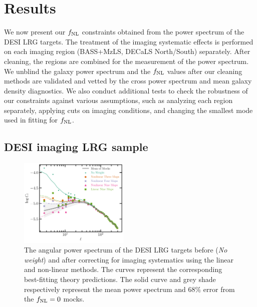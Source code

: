 \section{Results}\label{sec:results}
We now present our $f_{\rm NL}$ constraints obtained from the power spectrum of the DESI LRG targets. The treatment of the imaging systematic effects is performed on each imaging region (BASS+MzLS, DECaLS North/South) separately. After cleaning, the regions are combined for the measurement of the power spectrum. We unblind the galaxy power spectrum and the $f_{\rm NL}$ values after our cleaning methods are validated and vetted by the cross power spectrum and mean galaxy density diagnostics.  We also conduct additional tests to check the robustness of our constraints against various assumptions, such as analyzing each region separately, applying cuts on imaging conditions, and changing the smallest mode used in fitting for $f_{\rm NL}$.

\subsection{DESI imaging LRG sample}
\begin{figure}
    \centering
    \includegraphics[width=0.47\textwidth]{figures/model_dr9.pdf} 
    \caption{The angular power spectrum of the DESI LRG targets before (\textit{No weight}) and after correcting for imaging systematics using the linear and non-linear methods. The curves represent the corresponding best-fitting theory predictions. The solid curve and grey shade respectively represent the mean power spectrum and $68\%$ error from the $f_{\rm NL}=0$ mocks.}
    \label{fig:cl_dr9}
\end{figure}

